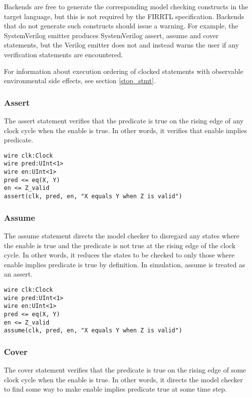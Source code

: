 \documentclass[12pt]{article}
\begin{document}
Backends are free to generate the corresponding model checking constructs in the target language, but this is not required by the FIRRTL specification. Backends that do not generate such constructs should issue a warning. For example, the SystemVerilog emitter produces SystemVerilog assert, assume and cover statements, but the Verilog emitter does not and instead warns the user if any verification statements are encountered.

For information about execution ordering of clocked statements with observable environmental side
effects, see section \ref{stop_stmt}.

\subsubsection{Assert}

The assert statement verifies that the predicate is true on the rising edge of any clock cycle when the enable is true. In other words, it verifies that enable implies predicate.

\begin{lstlisting}
wire clk:Clock
wire pred:UInt<1>
wire en:UInt<1>
pred <= eq(X, Y)
en <= Z_valid
assert(clk, pred, en, "X equals Y when Z is valid")
\end{lstlisting}

\subsubsection{Assume}

The assume statement directs the model checker to disregard any states where the enable is true and the predicate is not true at the rising edge of the clock cycle. In other words, it reduces the states to be checked to only those where enable implies predicate is true by definition. In simulation, assume is treated as an assert.

\begin{lstlisting}
wire clk:Clock
wire pred:UInt<1>
wire en:UInt<1>
pred <= eq(X, Y)
en <= Z_valid
assume(clk, pred, en, "X equals Y when Z is valid")
\end{lstlisting}

\subsubsection{Cover}

The cover statement verifies that the predicate is true on the rising edge of some clock cycle when the enable is true. In other words, it directs the model checker to find some way to make enable implies predicate true at some time step.
\end{document}
